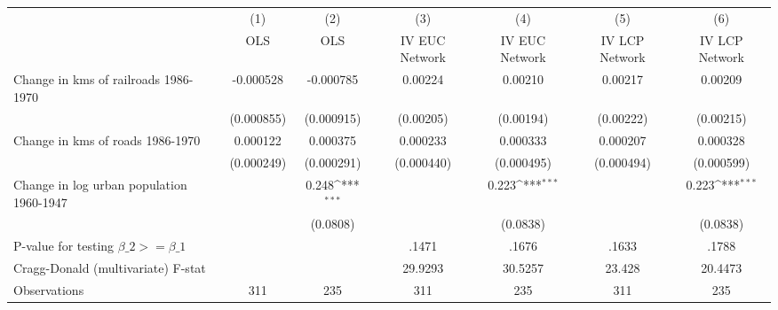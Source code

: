 {
\def\sym#1{\ifmmode^{#1}\else\(^{#1}\)\fi}
\begin{tabular}{l*{6}{c}}
\hline\hline
                &\multicolumn{1}{c}{(1)}&\multicolumn{1}{c}{(2)}&\multicolumn{1}{c}{(3)}&\multicolumn{1}{c}{(4)}&\multicolumn{1}{c}{(5)}&\multicolumn{1}{c}{(6)}\\
                &\multicolumn{1}{c}{OLS}&\multicolumn{1}{c}{OLS}&\multicolumn{1}{c}{IV EUC Network}&\multicolumn{1}{c}{IV EUC Network}&\multicolumn{1}{c}{IV LCP Network}&\multicolumn{1}{c}{IV LCP Network}\\
\hline
Change in kms of railroads 1986-1970&-0.000528         &-0.000785         &  0.00224         &  0.00210         &  0.00217         &  0.00209         \\
                &(0.000855)         &(0.000915)         &(0.00205)         &(0.00194)         &(0.00222)         &(0.00215)         \\
[1em]
Change in kms of roads 1986-1970& 0.000122         & 0.000375         & 0.000233         & 0.000333         & 0.000207         & 0.000328         \\
                &(0.000249)         &(0.000291)         &(0.000440)         &(0.000495)         &(0.000494)         &(0.000599)         \\
[1em]
Change in log urban population 1960-1947&                  &    0.248\sym{***}&                  &    0.223\sym{***}&                  &    0.223\sym{***}\\
                &                  & (0.0808)         &                  & (0.0838)         &                  & (0.0838)         \\
\hline
P-value for testing $\beta\_{2} >= \beta\_{1}$&                  &                  &    .1471         &    .1676         &    .1633         &    .1788         \\
Cragg-Donald (multivariate) F-stat&                  &                  &  29.9293         &  30.5257         &   23.428         &  20.4473         \\
Observations    &      311         &      235         &      311         &      235         &      311         &      235         \\
\hline\hline
\end{tabular}
}
